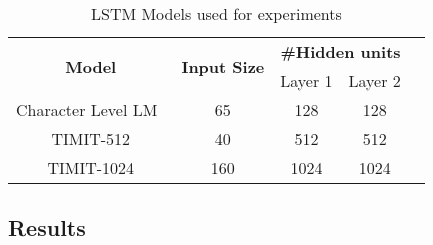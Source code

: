 \begin{table}[]
	\caption{LSTM Models used for experiments}
	\label{tab:lstmModels}
	\centering
	\begin{tabular}{@{}ccccll@{}}
		\toprule
		\multirow{2}{*}{\textbf{Model}} & \multirow{2}{*}{\textbf{Input Size}} & \multicolumn{2}{c}{\textbf{\#Hidden units}} & \multicolumn{2}{l}{\multirow{5}{*}{}} \\ \cmidrule(lr){3-4}
		&                                      & Layer 1              & Layer 2              & \multicolumn{2}{l}{}                  \\ \cmidrule(r){1-4}
		Character Level LM~\cite{azari2020elsa}                              & 65                                   & 128                  & 128                  & \multicolumn{2}{l}{}                  \\ \cmidrule(r){1-4}
		TIMIT-512 \cite{park2018maximizing}                      & 40                                   & 512                  & 512                  & \multicolumn{2}{l}{}                  \\ \cmidrule(r){1-4}
		TIMIT-1024 \cite{han2017ese}                     & 160                                  & 1024                 & 1024                 & \multicolumn{2}{l}{}                  \\ \bottomrule
	\end{tabular}
\end{table}
\subsection{Results}
